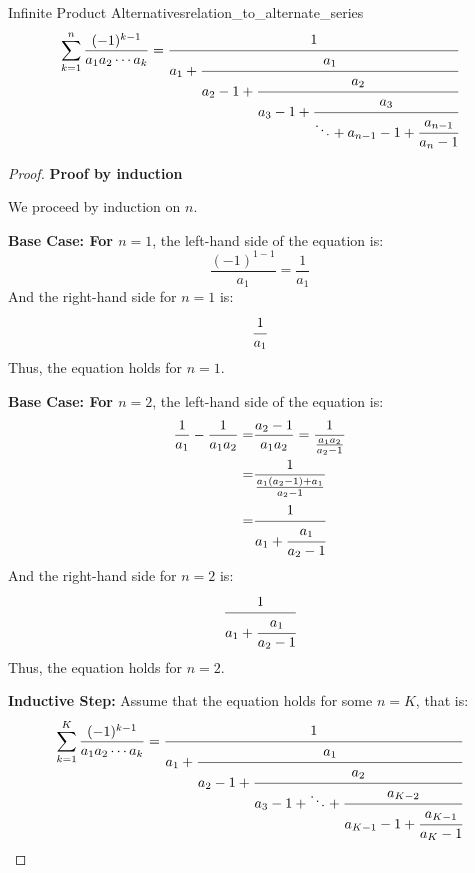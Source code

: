 \documentclass[a4paper]{article}
\begin{document}
\begin{mytheorem}{Infinite Product Alternatives}{relation_to_alternate_series}
  \[
    \sum_{k=1}^{n} \frac{(-1)^{k-1}}{a_1 a_2 \cdots a_k} = \cfrac{1}{a_1 + \cfrac{a_{1}}{a_2 - 1 +\cfrac{a_2}{a_3 - 1 +
          \cfrac{a_3}{\ddots +  a_{n-1} - 1 + \cfrac{a_{n-1}}{a_n - 1}}}}}
  \]

  \begin{proof}
    \textbf{Proof by induction}

    We proceed by induction on \( n \).

    \textbf{Base Case: For \( n = 1 \)}, the left-hand side of the equation is:
    \[
      \frac{(-1)^{1-1}}{a_1} = \frac{1}{a_1}
    \]
    And the right-hand side for \( n = 1 \) is:
    \[
      \cfrac{1}{a_1}
    \]
    Thus, the equation holds for \( n = 1 \).

    \textbf{Base Case: For \( n = 2 \)}, the left-hand side of the equation is:
    \begin{align*}
      \frac{1}{a_1} - \frac{1}{a_{1} a_{2}} = & \frac{a_2 - 1}{a_{1} a_{2}} = \frac{1}{\frac{a_{1} a_{2}}{a_2 - 1}}
      \\
      =                                       & \frac{1}{\frac{a_{1} (a_{2}-1) + a_{1}}{a_2 - 1}}
      \\
      =                                       & \cfrac{1}{a_{1} + \cfrac{a_{1}}{a_2 - 1}}
    \end{align*}
    And the right-hand side for \( n = 2 \) is:
    \[
      \cfrac{1}{a_{1} + \cfrac{a_{1}}{a_2 - 1}}
    \]
    Thus, the equation holds for \( n = 2 \).

    \textbf{Inductive Step:} Assume that the equation holds for some \( n = K \), that is:
    \[
      \sum_{k=1}^{K} \frac{(-1)^{k-1}}{a_1 a_2 \cdots a_k} = \cfrac{1}{a_1 + \cfrac{a_1}{a_2 - 1 + \cfrac{a_2}{a_3 - 1 +
            \ddots + \cfrac{a_{K-2}}{a_{K-1} - 1 + \cfrac{a_{K-1}}{a_K - 1}}}}}
    \]


\end{proof}
\end{mytheorem}
\end{document}

